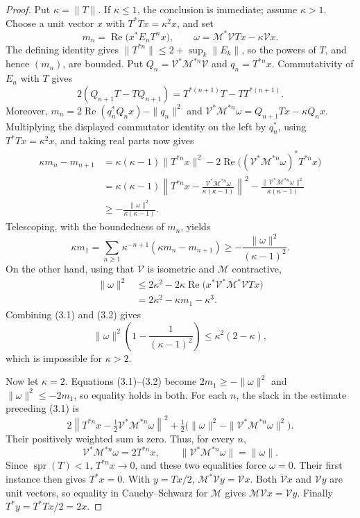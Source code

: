 \documentclass[preprints,article,submit,oneauthor]{Definitions/mdpi}
\numberwithin{equation}{section}
\newcommand{\spr}{\operatorname{spr}}
\newcommand{\Rea}{\operatorname{Re}}
\begin{document}
\begin{proof}
Put \(\kappa=\|T\|\).  If \(\kappa\leq1\), the conclusion is immediate; assume
\(\kappa>1\).  Choose a unit vector \(x\) with \(T^*Tx=\kappa^2x\), and set
\[
 m_n=\Rea\bigl(x^*E_nT^nx\bigr),\qquad
 \omega=\mathcal M^*\mathcal VTx-\kappa\mathcal Vx.
\]
The defining identity gives
\(\|T^{*n}\|\leq2+\sup_k\|E_k\|\), so the powers of \(T\), and hence
\((m_n)\), are bounded.  Put
\(Q_n=\mathcal V^*\mathcal M^{*n}\mathcal V\) and
\(q_n=T^{*n}x\).  Commutativity of \(E_n\) with \(T\) gives
\[
 2(Q_{n+1}T-TQ_{n+1})
 =T^{*(n+1)}T-TT^{*(n+1)}.
\]
Moreover,
\(m_n=2\Rea(q_n^*Q_nx)-\|q_n\|^2\) and
\(
 \mathcal V^*\mathcal M^{*n}\omega=Q_{n+1}Tx-\kappa Q_nx.
\)
Multiplying the displayed commutator identity on the left by \(q_n^*\), using
\(T^*Tx=\kappa^2x\), and taking real parts now gives
\begin{align*}
 \kappa m_n-m_{n+1}
 &=\kappa(\kappa-1)\|T^{*n}x\|^2
   -2\Rea\bigl((\mathcal V^*\mathcal M^{*n}\omega)^*T^{*n}x\bigr)\\
 &=\kappa(\kappa-1)
   \left\|T^{*n}x-\frac{\mathcal V^*\mathcal M^{*n}\omega}
   {\kappa(\kappa-1)}\right\|^2
   -\frac{\|\mathcal V^*\mathcal M^{*n}\omega\|^2}{\kappa(\kappa-1)}\\
 &\geq-\frac{\|\omega\|^2}{\kappa(\kappa-1)}.
\end{align*}
Telescoping, with the boundedness of \(m_n\), yields
\[
 \kappa m_1
 =\sum_{n\geq1}\kappa^{-n+1}(\kappa m_n-m_{n+1})
 \geq-\frac{\|\omega\|^2}{(\kappa-1)^2}.               \tag{3.1}
\]
On the other hand, using that \(\mathcal V\) is isometric and \(\mathcal M\) contractive,
\begin{align*}
 \|\omega\|^2
 &\leq2\kappa^2
 -2\kappa\Rea\bigl(x^*\mathcal V^*\mathcal M^*\mathcal VTx\bigr)\\
 &=2\kappa^2-\kappa m_1-\kappa^3.                     \tag{3.2}
\end{align*}
Combining (3.1) and (3.2) gives
\[
 \|\omega\|^2\left(1-\frac1{(\kappa-1)^2}\right)
 \leq\kappa^2(2-\kappa),
\]
which is impossible for \(\kappa>2\).

Now let \(\kappa=2\).  Equations (3.1)--(3.2) become
\(2m_1\geq-\|\omega\|^2\) and \(\|\omega\|^2\leq-2m_1\), so equality holds in both.
For each \(n\), the slack in the estimate preceding (3.1) is
\[
 2\left\|T^{*n}x-\tfrac12\mathcal V^*\mathcal M^{*n}\omega\right\|^2
 +\tfrac12\bigl(\|\omega\|^2-\|\mathcal V^*\mathcal M^{*n}\omega\|^2\bigr).
\]
Their positively weighted sum is zero.
Thus, for every \(n\),
\[
 \mathcal V^*\mathcal M^{*n}\omega=2T^{*n}x,
 \qquad
 \|\mathcal V^*\mathcal M^{*n}\omega\|=\|\omega\|.
\]
Since \(\spr(T)<1\), \(T^{*n}x\to0\), and these two equalities force
\(\omega=0\).  Their first instance then gives \(T^*x=0\).
With \(y=Tx/2\), \(\mathcal M^*\mathcal Vy=\mathcal Vx\).  Both
\(\mathcal Vx\) and \(\mathcal Vy\) are unit vectors, so equality in
Cauchy--Schwarz for \(\mathcal M\) gives \(\mathcal M\mathcal Vx=\mathcal Vy\).
Finally \(T^*y=T^*Tx/2=2x\).
\end{proof}
\end{document}
